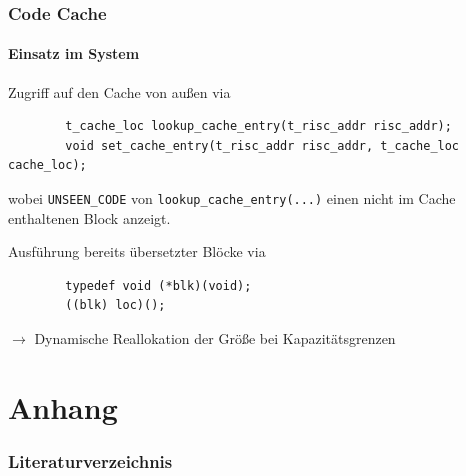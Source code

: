 \documentclass[german]{tum-presentation}
\newcommand{\refer}[0]{\ensuremath{\rightarrow} }
\begin{document}
\begin{frame}[fragile]
	\frametitle{Code Cache}
	\framesubtitle{Einsatz im System}
	
	Zugriff auf den Cache von außen via
	\begin{lstlisting}
		t_cache_loc lookup_cache_entry(t_risc_addr risc_addr);
		void set_cache_entry(t_risc_addr risc_addr, t_cache_loc cache_loc);
	\end{lstlisting}
	
	wobei \verb!UNSEEN_CODE! von \verb!lookup_cache_entry(...)! einen nicht im Cache enthaltenen Block anzeigt.
	
	\vspace{0.5cm}
	\pause
	Ausführung bereits übersetzter Blöcke via
	\begin{lstlisting}
		typedef void (*blk)(void);
		((blk) loc)();
	\end{lstlisting}
	
	\vspace{0.1cm}
	\pause
	\refer Dynamische Reallokation der Größe bei Kapazitätsgrenzen
\end{frame}


\section{Anhang}
\begin{frame}
 	\frametitle{Literaturverzeichnis}
 	\printbibliography
\end{frame}
\end{document}
